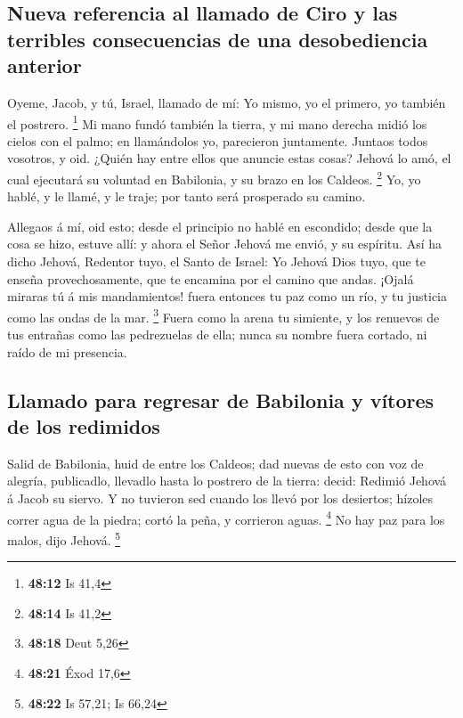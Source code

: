\hypertarget{nueva-referencia-al-llamado-de-ciro-y-las-terribles-consecuencias-de-una-desobediencia-anterior}{%
\subsection{Nueva referencia al llamado de Ciro y las terribles
consecuencias de una desobediencia
anterior}\label{nueva-referencia-al-llamado-de-ciro-y-las-terribles-consecuencias-de-una-desobediencia-anterior}}

 Oyeme, Jacob, y tú, Israel, llamado de mí: Yo mismo, yo el
primero, yo también el postrero. \footnote{\textbf{48:12} Is 41,4}
 Mi mano fundó también la tierra, y mi mano derecha midió
los cielos con el palmo; en llamándolos yo, parecieron juntamente.
 Juntaos todos vosotros, y oid. ¿Quién hay entre ellos que
anuncie estas cosas? Jehová lo amó, el cual ejecutará su voluntad en
Babilonia, y su brazo en los Caldeos. \footnote{\textbf{48:14} Is 41,2}
 Yo, yo hablé, y le llamé, y le traje; por tanto será
prosperado su camino.

 Allegaos á mí, oid esto; desde el principio no hablé en
escondido; desde que la cosa se hizo, estuve allí: y ahora el Señor
Jehová me envió, y su espíritu.  Así ha dicho Jehová,
Redentor tuyo, el Santo de Israel: Yo Jehová Dios tuyo, que te enseña
provechosamente, que te encamina por el camino que andas. 
¡Ojalá miraras tú á mis mandamientos! fuera entonces tu paz como un río,
y tu justicia como las ondas de la mar. \footnote{\textbf{48:18} Deut
  5,26}  Fuera como la arena tu simiente, y los renuevos de
tus entrañas como las pedrezuelas de ella; nunca su nombre fuera
cortado, ni raído de mi presencia.

\hypertarget{llamado-para-regresar-de-babilonia-y-vuxedtores-de-los-redimidos}{%
\subsection{Llamado para regresar de Babilonia y vítores de los
redimidos}\label{llamado-para-regresar-de-babilonia-y-vuxedtores-de-los-redimidos}}

 Salid de Babilonia, huid de entre los Caldeos; dad nuevas
de esto con voz de alegría, publicadlo, llevadlo hasta lo postrero de la
tierra: decid: Redimió Jehová á Jacob su siervo.  Y no
tuvieron sed cuando los llevó por los desiertos; hízoles correr agua de
la piedra; cortó la peña, y corrieron aguas. \footnote{\textbf{48:21}
  Éxod 17,6}  No hay paz para los malos, dijo Jehová.
\footnote{\textbf{48:22} Is 57,21; Is 66,24}

